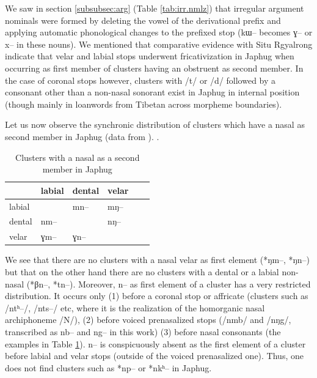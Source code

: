 \documentclass[oldfontcommands,oneside,a4paper,11pt]{article}
\newcommand{\ipa}[1]{{\phon \mbox{#1}}} %
\newcommand{\grise}[1]{\cellcolor{lightgray}\textbf{#1}}
\begin{document}
We saw in section \ref{subsubsec:arg} (Table \ref{tab:irr.nmlz}) that irregular argument nominals were formed by deleting the vowel of the derivational prefix and applying automatic phonological changes to the prefixed stop (\ipa{kɯ}-- becomes \ipa{ɣ}-- or \ipa{x}-- in these nouns). We mentioned that comparative evidence with Situ Rgyalrong indicate that velar and labial stops underwent fricativization in Japhug when occurring as first member of  clusters having an obstruent as   second member. In the case of coronal stops however, clusters with /t/ or /d/ followed by a consonant other than a non-nasal sonorant exist in Japhug in internal position (though mainly in loanwords from Tibetan across morpheme boundaries).

Let us now observe the synchronic distribution of clusters which have a nasal as second member in Japhug (data from \citealt{jacques04these}).
.

\begin{table}[H]
\caption{Clusters with a nasal as a second member in Japhug}  \label{tab:nasal} \centering
\begin{tabular}{llllll}
\toprule
  &  	labial  &  	dental  &  	velar  \\  
  \midrule
labial  &  	\grise{}  &  	\ipa{mn--}  &  	\ipa{mŋ--}  \\  
dental  &  	\ipa{nm--}  &  	\grise{}  &  	\ipa{nŋ--}  \\  
velar  &  	\ipa{ɣm--}  &  	\ipa{ɣn--}  &  	\grise{}  \\  
\bottomrule
\end{tabular}
\end{table}

We see that there are no clusters with a nasal velar as first element (*ŋm--, *ŋn--) but that on the other hand there are no clusters with a dental or a labial non-nasal (*βn--, *tn--). Moreover, \ipa{n}-- as first element of a cluster has a very restricted distribution. It occurs only (1) before a coronal stop or affricate (clusters such as /\ipa{ntʰ--}/, /\ipa{nts--}/ etc, where it is the realization of the homorganic nasal archiphoneme /N/), (2) before voiced prenasalized stops (/\ipa{nmb}/ and /\ipa{nŋg}/, transcribed as \ipa{nb--} and \ipa{ng--} in this work) (3) before nasal consonants (the examples in Table \ref{tab:nasal}). \ipa{n}-- is conspicuously absent as the first element of a cluster before labial  and velar stops (outside of the voiced prenasalized one). Thus, one does not find clusters such as *\ipa{np--} or *\ipa{nkʰ--} in Japhug. 
\end{document}
